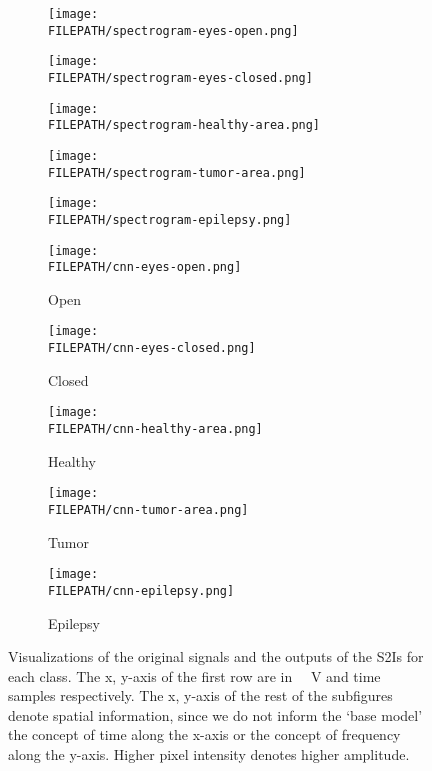 \documentclass[conference]{IEEEtran}
\providecommand{\FILEPATH}{~/github.com/pbizopoulos/signal2image-modules-in-deep-neural-networks-for-eeg-classification/packages/default/tmp}
\begin{document}
\begin{figure*}[!t]
  \begin{subfigure}{0.19\linewidth}
    \centering
    \texttt{[image: \\FILEPATH/spectrogram-eyes-open.png]}
  \end{subfigure}
  \begin{subfigure}{0.19\linewidth}
    \centering
    \texttt{[image: \\FILEPATH/spectrogram-eyes-closed.png]}
  \end{subfigure}
  \begin{subfigure}{0.19\linewidth}
    \centering
    \texttt{[image: \\FILEPATH/spectrogram-healthy-area.png]}
  \end{subfigure}
  \begin{subfigure}{0.19\linewidth}
    \centering
    \texttt{[image: \\FILEPATH/spectrogram-tumor-area.png]}
  \end{subfigure}
  \begin{subfigure}{0.19\linewidth}
    \centering
    \texttt{[image: \\FILEPATH/spectrogram-epilepsy.png]}
  \end{subfigure}

  \begin{subfigure}{0.19\linewidth}
    \centering
    \texttt{[image: \\FILEPATH/cnn-eyes-open.png]}
    \caption{Open}
  \end{subfigure}
  \begin{subfigure}{0.19\linewidth}
    \centering
    \texttt{[image: \\FILEPATH/cnn-eyes-closed.png]}
    \caption{Closed}
  \end{subfigure}
  \begin{subfigure}{0.19\linewidth}
    \centering
    \texttt{[image: \\FILEPATH/cnn-healthy-area.png]}
    \caption{Healthy}
  \end{subfigure}
  \begin{subfigure}{0.19\linewidth}
    \centering
    \texttt{[image: \\FILEPATH/cnn-tumor-area.png]}
    \caption{Tumor}
  \end{subfigure}
  \begin{subfigure}{0.19\linewidth}
    \centering
    \texttt{[image: \\FILEPATH/cnn-epilepsy.png]}
    \caption{Epilepsy}
  \end{subfigure}
  \caption{Visualizations of the original signals and the outputs of the S2Is for each class.
    The x, y-axis of the first row are in \SI{}{\micro{} V} and time samples respectively.
    The x, y-axis of the rest of the subfigures denote spatial information, since we do not inform the `base model' the concept of time along the x-axis or the concept of frequency along the y-axis.
  Higher pixel intensity denotes higher amplitude.}\label{fig:signal2imageoutputs}
\end{figure*}
\end{document}
